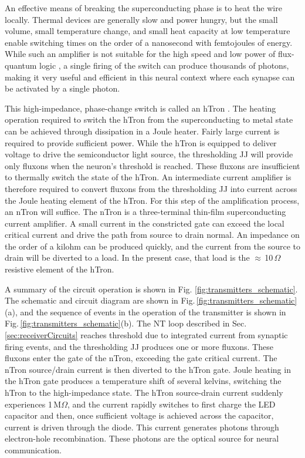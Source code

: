 \documentclass[twocolumn]{article}
\begin{document}
An effective means of breaking the superconducting phase is to heat the wire locally. Thermal devices are generally slow and power hungry, but the small volume, small temperature change, and small heat capacity at low temperature \cite{lasa1988,du2015} enable switching times on the order of a nanosecond with femtojoules of energy. While such an amplifier is not suitable for the high speed and low power of flux-quantum logic \cite{hehe2011,mu2011,li2012,taoz2013}, a single firing of the switch can produce thousands of photons, making it very useful and efficient in this neural context where each synapse can be activated by a single photon.

This high-impedance, phase-change switch is called an hTron \cite{zhto2018}. The heating operation required to switch the hTron from the superconducting to metal state can be achieved through dissipation in a Joule heater. Fairly large current is required to provide sufficient power. While the hTron is equipped to deliver voltage to drive the semiconductor light source, the thresholding JJ will provide only fluxons when the neuron's threshold is reached. These fluxons are insufficient to thermally switch the state of the hTron. An intermediate current amplifier is therefore required to convert fluxons from the thresholding JJ into current across the Joule heating element of the hTron. For this step of the amplification process, an nTron \cite{mcbe2014} will suffice. The nTron is a three-terminal thin-film superconducting current amplifier. A small current in the constricted gate can exceed the local critical current and drive the path from source to drain normal. An impedance on the order of a kilohm can be produced quickly, and the current from the source to drain will be diverted to a load. In the present case, that load is the $\approx$\,10\,$\Omega$ resistive element of the hTron. 

A summary of the circuit operation is shown in Fig. \ref{fig:transmitters_schematic}. The schematic and circuit diagram are shown in Fig.\,\ref{fig:transmitters_schematic}(a), and the sequence of events in the operation of the transmitter is shown in Fig.\,\ref{fig:transmitters_schematic}(b). The NT loop described in Sec.\,\ref{sec:receiverCircuits} reaches threshold due to integrated current from synaptic firing events, and the thresholding JJ produces one or more fluxons. These fluxons enter the gate of the nTron, exceeding the gate critical current. The nTron source/drain current is then diverted to the hTron gate. Joule heating in the hTron gate produces a temperature shift of several kelvins, switching the hTron to the high-impedance state. The hTron source-drain current suddenly experiences 1\,M$\Omega$, and the current rapidly switches to first charge the LED capacitor and then, once sufficient voltage is achieved across the capacitor, current is driven through the diode. This current generates photons through electron-hole recombination. These photons are the optical source for neural communication.
\end{document}
